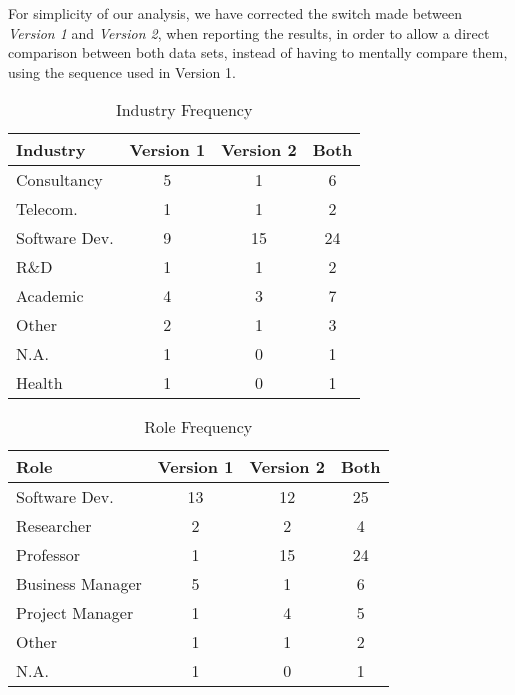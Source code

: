 For simplicity of our analysis, we have corrected the switch made between \textit{Version 1} and \textit{Version 2}, when reporting the results, in order to allow a direct comparison between both data sets, instead of having to mentally compare them, using the sequence used in Version 1.

\begin{table}[htb]
	\centering
	\caption{Industry Frequency}
	\label{tab: industry}
	\begin{tabular}{l|cc|c}
		\hline \bf Industry & \bf Version 1 & \bf Version 2 & \bf Both \\ \hline
		Consultancy         & 5             & 1             & 6        \\
		Telecom.            & 1             & 1             & 2        \\
		Software Dev.       & 9             & 15            & 24       \\
		R\&D                & 1             & 1             & 2        \\
		Academic            & 4             & 3             & 7        \\
		Other               & 2             & 1             & 3        \\
		N.A.                & 1             & 0             & 1        \\
		Health              & 1             & 0             & 1        \\
		\hline
	\end{tabular}
\end{table}

\begin{table}[htb]
	\centering
	\caption{Role Frequency}
	\label{tab: roles}
	\begin{tabular}{l|cc|c}
		\hline \bf Role  & \bf Version 1 & \bf Version 2 & \bf Both \\ \hline
		Software Dev.    & 13            & 12            & 25       \\
		Researcher       & 2             & 2             & 4        \\
		Professor        & 1             & 15            & 24       \\
		Business Manager & 5             & 1             & 6        \\
		Project Manager  & 1             & 4             & 5        \\
		Other            & 1             & 1             & 2        \\
		N.A.             & 1             & 0             & 1        \\
		\hline
	\end{tabular}
\end{table}


